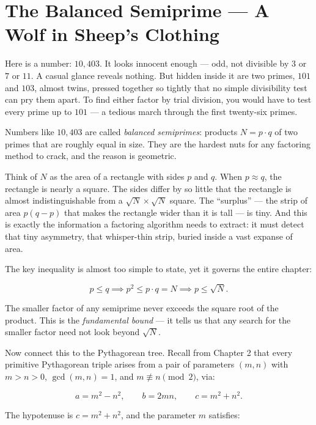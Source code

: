\section{The Balanced Semiprime --- A Wolf in Sheep's Clothing}\label{ch8-the-balanced-semiprime-a-wolf-in-sheeps-clothing}

Here is a number: \(10{,}403\). It looks innocent enough --- odd, not divisible by \(3\) or \(7\) or \(11\). A casual glance reveals nothing. But hidden inside it are two primes, \(101\) and \(103\), almost twins, pressed together so tightly that no simple divisibility test can pry them apart. To find either factor by trial division, you would have to test every prime up to \(101\) --- a tedious march through the first twenty-six primes.

Numbers like \(10{,}403\) are called \emph{balanced semiprimes}: products \(N = p \cdot q\) of two primes that are roughly equal in size. They are the hardest nuts for any factoring method to crack, and the reason is geometric.

Think of \(N\) as the area of a rectangle with sides \(p\) and \(q\). When \(p \approx q\), the rectangle is nearly a square. The sides differ by so little that the rectangle is almost indistinguishable from a \(\sqrt{N} \times \sqrt{N}\) square. The ``surplus'' --- the strip of area \(p(q - p)\) that makes the rectangle wider than it is tall --- is tiny. And this is exactly the information a factoring algorithm needs to extract: it must detect that tiny asymmetry, that whisper-thin strip, buried inside a vast expanse of area.

The key inequality is almost too simple to state, yet it governs the entire chapter:

\[p \le q \implies p^2 \le p \cdot q = N \implies p \le \sqrt{N}.\]

The smaller factor of any semiprime never exceeds the square root of the product. This is the \emph{fundamental bound} --- it tells us that any search for the smaller factor need not look beyond \(\sqrt{N}\).

Now connect this to the Pythagorean tree. Recall from Chapter 2 that every primitive Pythagorean triple arises from a pair of parameters \((m, n)\) with \(m > n > 0\), \(\gcd(m, n) = 1\), and \(m \not\equiv n \pmod{2}\), via:

\[a = m^2 - n^2, \qquad b = 2mn, \qquad c = m^2 + n^2.\]

The hypotenuse is \(c = m^2 + n^2\), and the parameter \(m\) satisfies:

